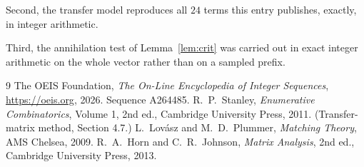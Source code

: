 \documentclass[11pt,a4paper]{article}
\theoremstyle{plain}
\theoremstyle{definition}
\begin{document}
Second, the transfer model reproduces all $24$ terms this entry publishes, exactly, in
integer arithmetic.

Third, the annihilation test of Lemma~\ref{lem:crit} was carried out in exact integer
arithmetic on the whole vector rather than on a sampled prefix.

\begin{thebibliography}{9}
 The OEIS Foundation, \emph{The On-Line Encyclopedia of Integer
Sequences}, \url{https://oeis.org}, 2026. Sequence A264485.
 R.~P.~Stanley, \emph{Enumerative Combinatorics}, Volume 1, 2nd ed.,
Cambridge University Press, 2011. (Transfer-matrix method, Section 4.7.)
 L.~Lov\'asz and M.~D.~Plummer, \emph{Matching Theory}, AMS Chelsea, 2009.
 R.~A.~Horn and C.~R.~Johnson, \emph{Matrix Analysis}, 2nd ed., Cambridge
University Press, 2013.
\end{thebibliography}
\end{document}
